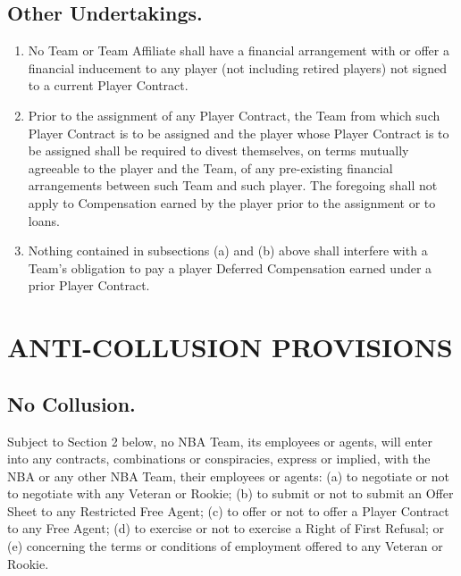 \documentclass[
]{book}
\providecommand{\tightlist}{%
  \setlength{\itemsep}{0pt}\setlength{\parskip}{0pt}}
\begin{document}
\hypertarget{other-undertakings.}{%
\section{Other Undertakings.}\label{other-undertakings.}}

\begin{enumerate}
\def\labelenumi{(\alph{enumi})}
\tightlist
\item
  No Team or Team Affiliate shall have a financial arrangement with or offer a financial inducement to any player (not including retired players) not signed to a current Player Contract.
\item
  Prior to the assignment of any Player Contract, the Team from which such Player Contract is to be assigned and the player whose Player Contract is to be assigned shall be required to divest themselves, on terms mutually agreeable to the player and the Team, of any pre-existing financial arrangements between such Team and such player. The foregoing shall not apply to Compensation earned by the player prior to the assignment or to loans.
\item
  Nothing contained in subsections (a) and (b) above shall interfere with a Team's obligation to pay a player Deferred Compensation earned under a prior Player Contract.
\end{enumerate}

\hypertarget{anti-collusion-provisions}{%
\chapter{ANTI-COLLUSION PROVISIONS}\label{anti-collusion-provisions}}

\hypertarget{no-collusion.}{%
\section{\texorpdfstring{\textbf{No Collusion.}}{No Collusion.}}\label{no-collusion.}}

Subject to Section 2 below, no NBA Team, its employees or agents, will enter into any contracts, combinations or conspiracies, express or implied, with the NBA or any other NBA Team, their employees or agents: (a) to negotiate or not to negotiate with any Veteran or Rookie; (b) to submit or not to submit an Offer Sheet to any Restricted Free Agent; (c) to offer or not to offer a Player Contract to any Free Agent; (d) to exercise or not to exercise a Right of First Refusal; or (e) concerning the terms or conditions of employment offered to any Veteran or Rookie.
\end{document}
